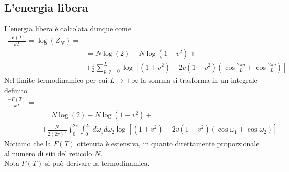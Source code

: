 \documentclass[11pt]{article}
\DeclareMathOperator{\Log}{log}
\begin{document}
\subsection{L'energia libera}
L'energia libera è calcolata dunque come
\begin{equation}
\begin{split}
\frac{-F(T)}{kT}=\Log(Z_N)=\\
&=N\Log(2)-N\Log(1-v^2)+\\
&+\frac{1}{2} \sum_{p,q=0}^L\Log\left[ (1+v^2)-2v(1-v^2) \left( \cos{\frac{2\pi p}{L}}+\cos{\frac{2\pi q}{L}} \right) \right]
\end{split}
\end{equation}
Nel limite termodinamico per cui $L\to+\infty$ la somma si trasforma in un integrale definito
\begin{equation}
\begin{split}
\frac{-F(T)}{kT}=\\
&=N\Log(2)-N\Log(1-v^2)+
\\&+\frac{N}{2(2\pi)^2}\int_0^{2\pi}\int_0^{2\pi} d\omega_1 d\omega_2 \Log\left[ (1+v^2)-2v(1-v^2) \left( \cos{\omega_1}+\cos{\omega_2} \right) \right]
\end{split}
\end{equation}
Notiamo che la $F(T)$ ottenuta è estensiva, in quanto direttamente proporzionale al numero di siti del reticolo $N$.\\
Nota $F(T)$ si può derivare la termodinamica.
\end{document}
